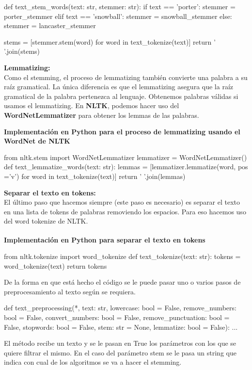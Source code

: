 \documentclass{llncs}
\begin{document}
\begin{python}
    def text_stem_words(text: str, stemmer: str):
        if text == 'porter':
            stemmer = porter_stemmer
        elif text == 'snowball':
            stemmer = snowball_stemmer
        else:
            stemmer = lancaster_stemmer

        stems = [stemmer.stem(word) for word in text_tokenize(text)]
        return ' '.join(stems)
\end{python}

\noindent
\textbf{Lemmatizing:}\\
Como el stemming, el proceso de lemmatizing también convierte una palabra
a su raíz gramatical. La única diferencia es que el lemmatizing asegura que
la raíz gramatical de la palabra pertenezca al lenguaje. Obtenemos palabras
válidas si usamos el lemmatizing. En \textbf{NLTK}, podemos hacer uso del 
\textbf{WordNetLemmatizer} para obtener los lemmas de las palabras. 

\noindent
\textbf{Implementación en Python para el proceso de lemmatizing usando el WordNet de NLTK}

\begin{python}
from nltk.stem import WordNetLemmatizer
lemmatizer = WordNetLemmatizer()
def text_lemmatize_words(text: str):
lemmas = [lemmatizer.lemmatize(word, pos ='v') for word in text_tokenize(text)]
return ' '.join(lemmas)
\end{python}

\noindent
\textbf{Separar el texto en tokens:}\\
El último paso que hacemos siempre (este paso es necesario) 
es separar el texto en una lista de tokens de palabras 
removiendo los espacios. Para eso hacemos uso del word tokenize 
de NLTK.
\\\\
\noindent
\textbf{Implementación en Python para separar el texto en tokens}

\begin{python}
from nltk.tokenize import word_tokenize
def text_tokenize(text: str):
    tokens = word_tokenize(text)
    return tokens
\end{python}
\noindent
De la forma en que está hecho el código se le puede pasar uno o varios pasos de preprocesamiento 
al texto según se requiera. 
\\
\begin{python}
def text_preprocessing(*, text: str, 
    lowercase: bool = False, 
    remove_numbers: bool = False,
    convert_numbers: bool = False,
    remove_punctuation: bool = False,
    stopwords: bool = False,
    stem: str = None,
    lemmatize: bool = False):
    ...
\end{python}
El método recibe un texto y se le pasan en True los parámetros con los que
se quiere filtrar el mismo. En el caso del parámetro stem se le pasa un string 
que indica con cual de los algoritmos se va a hacer el stemming. 
\end{document}
